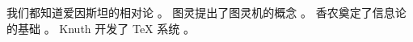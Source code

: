 \documentclass[a4paper,12pt]{ctexart}%
\begin{document}

\newpage%


\pagestyle{empty}   %
\tableofcontents    %

\newpage             %


\pagestyle{reportstyle} %
\renewcommand{\sectionmark}[1]{\markboth{#1}{}} %
\setcounter{page}{1}    %











我们都知道爱因斯坦的相对论 \cite{einstein}。
图灵提出了图灵机的概念 \cite{turing1936}。
香农奠定了信息论的基础 \cite{shannon1948}。
Knuth 开发了 TeX 系统 \cite{knuth1984}。

\newpage



\printbibliography[heading=bibintoc, title=参考文献]
\end{document}
